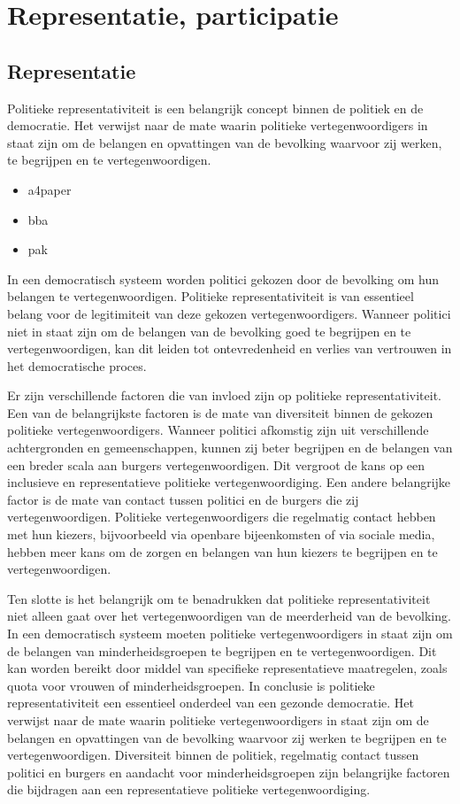 \chapter{Representatie, participatie}
\section{Representatie\label{aa1}}
Politieke representativiteit is een belangrijk concept binnen de politiek en de democratie. Het verwijst naar de mate waarin politieke vertegenwoordigers in staat zijn om de belangen en opvattingen van de bevolking waarvoor zij werken, te begrijpen en te vertegenwoordigen.

\begin{itemize}
    \item a4paper
    \item bba 
    \item pak 
\end{itemize}

In een democratisch systeem worden politici gekozen door de bevolking om hun belangen te vertegenwoordigen. Politieke representativiteit is van essentieel belang voor de legitimiteit van deze gekozen vertegenwoordigers. Wanneer politici niet in staat zijn om de belangen van de bevolking goed te begrijpen en te vertegenwoordigen, kan dit leiden tot ontevredenheid en verlies van vertrouwen in het democratische proces.

Er zijn verschillende factoren die van invloed zijn op politieke representativiteit. Een van de belangrijkste factoren is de mate van diversiteit binnen de gekozen politieke vertegenwoordigers. Wanneer politici afkomstig zijn uit verschillende achtergronden en gemeenschappen, kunnen zij beter begrijpen en de belangen van een breder scala aan burgers vertegenwoordigen. Dit vergroot de kans op een inclusieve en representatieve politieke vertegenwoordiging.
Een andere belangrijke factor is de mate van contact tussen politici en de burgers die zij vertegenwoordigen. Politieke vertegenwoordigers die regelmatig contact hebben met hun kiezers, bijvoorbeeld via openbare bijeenkomsten of via sociale media, hebben meer kans om de zorgen en belangen van hun kiezers te begrijpen en te vertegenwoordigen.

Ten slotte is het belangrijk om te benadrukken dat politieke representativiteit niet alleen gaat over het vertegenwoordigen van de meerderheid van de bevolking. In een democratisch systeem moeten politieke vertegenwoordigers in staat zijn om de belangen van minderheidsgroepen te begrijpen en te vertegenwoordigen. Dit kan worden bereikt door middel van specifieke representatieve maatregelen, zoals quota voor vrouwen of minderheidsgroepen.
In conclusie is politieke representativiteit een essentieel onderdeel van een gezonde democratie. Het verwijst naar de mate waarin politieke vertegenwoordigers in staat zijn om de belangen en opvattingen van de bevolking waarvoor zij werken te begrijpen en te vertegenwoordigen. Diversiteit binnen de politiek, regelmatig contact tussen politici en burgers en aandacht voor minderheidsgroepen zijn belangrijke factoren die bijdragen aan een representatieve politieke vertegenwoordiging.

